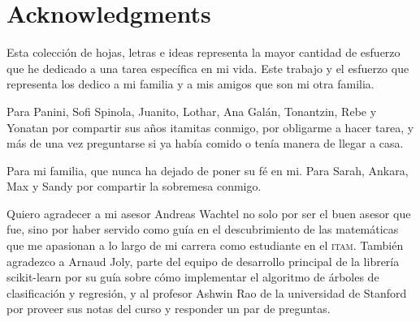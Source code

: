{
    \chapter*{Acknowledgments}

    Esta colección de hojas, letras e ideas representa la mayor cantidad de
    esfuerzo que he dedicado a una tarea específica en mi vida. Este trabajo y
    el esfuerzo que representa los dedico a mi familia y a mis amigos que son mi
    otra familia.

    Para Panini, Sofi Spinola, Juanito, Lothar, Ana Galán, Tonantzin, Rebe y Yonatan por compartir sus años itamitas conmigo, por obligarme a hacer tarea, y
    más de una vez preguntarse si ya había comido o tenía manera de llegar a
    casa.
    
    Para mi familia, que nunca ha dejado de poner su fé en mi. Para Sarah,
    Ankara, Max y Sandy por compartir la sobremesa conmigo.
    

    \bigskip

    Quiero agradecer a mi asesor Andreas Wachtel no solo por ser el buen asesor
    que fue, sino por haber servido como guía en el descubrimiento de las
    matemáticas que me apasionan a lo largo de mi carrera como estudiante en el
    \textsc{itam}. También agradezco a Arnaud Joly, parte del equipo de
    desarrollo principal de la librería scikit-learn por su guía sobre cómo
    implementar el algoritmo de árboles de clasificación y regresión, y al
    profesor Ashwin Rao de la universidad de Stanford por proveer sus notas del
    curso y responder un par de preguntas.
}